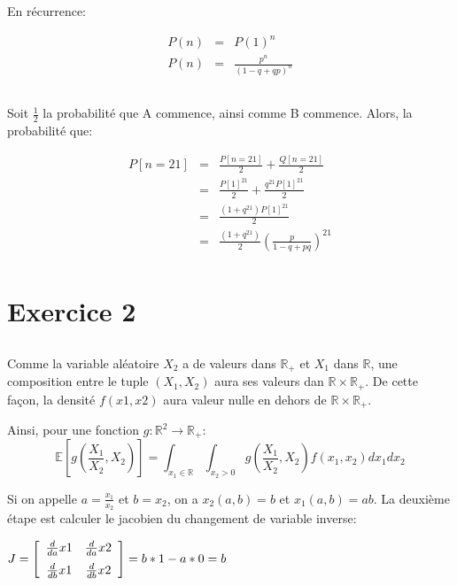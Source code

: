 \documentclass[a4paper]{article}
\begin{document}
En récurrence:

\begin{eqnarray*}
  P(n) & =& P(1)^n\\
  P(n)& = &\frac{p^n}{(1-q+qp)^n}
\end{eqnarray*}


\subsection{}
Soit $\frac{1}{2}$ la probabilité que A commence, ainsi comme B commence.
Alors, la probabilité que:

\begin{eqnarray*}
 P[n=21] &=&\frac{P[n=21]}{2}+\frac{Q[n=21]}{2}\\
 &=& \frac{P[1]^{21}}{2}+\frac{q^{21}P[1]^{21}}{2}\\
 &=& \frac{(1+q^{21})P[1]^{21}}{2}\\
 &=& \frac{(1+q^{21})}{2}(\frac{p}{1-q+pq})^{21}\\
\end{eqnarray*}



\section{Exercice 2 }
\subsection{}

Comme la variable aléatoire $X_2$ a de valeurs dans $\mathbb{R}_+$ et $X_1$ dans
$\mathbb{R}$, une composition  entre le tuple $(X_1 , X_2)$  aura ses valeurs dan
$\mathbb{R}\times\mathbb{R}_+$. De  cette façon,  la densité $f(x1,  x2)$ aura
valeur nulle en dehors de $\mathbb{R}\times\mathbb{R}_+$.

Ainsi, pour une fonction $g:\mathbb{R}^2 \rightarrow \mathbb{R}_+$:
\begin{equation}
 \mathbb{E}[g(\frac{X_1}{X_2},X_2)]=\int_{x_1 \in \mathbb{R}} \int_{x_2>0}g(\frac{X_1}{X_2},X_2)f(x_1,x_2)dx_1dx_2
\end{equation}

Si   on  appelle   $a=\frac{x_1}{x_2}$  et   $b=x_2$,  on   a   $x_2(a,b)=b$  et
$x_1(a,b)=ab$.   La deuxième  étape est  calculer le  jacobien du  changement de
variable inverse:

$J=\left[ \begin {array}{cc} {\frac {d}{da}}x1&{\frac {d}{da}}x2\\\noalign{\medskip}{\frac {d}{db}}x1&{\frac {d}{db}}x2\end {array}
\right] = b*1-a*0=b
$ 
\end{document}
